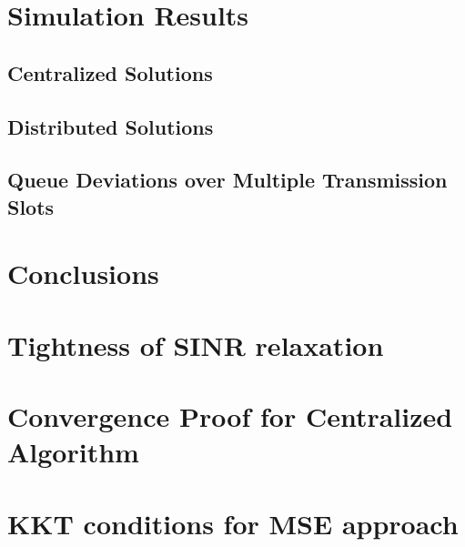 \documentclass[10pt,journal,twocolumn,letterpaper]{./../Styles/IEEEtran}
\begin{document}
\section{Simulation Results} \label{sec-5}


\subsection{Centralized Solutions}


\subsection{Distributed Solutions}


\subsection{Queue Deviations over Multiple Transmission Slots} \label{time-correlated}
\review{}

\section{Conclusions} \label{sec-6}


\appendices

%

\section{Tightness of \ac{SINR} relaxation} \label{a-3}
\review{}

\section{Convergence Proof for Centralized Algorithm} \label{sec-3.5}
\review{}

\section{\ac{KKT} conditions for \ac{MSE} approach} \label{a-1}




\end{document}
